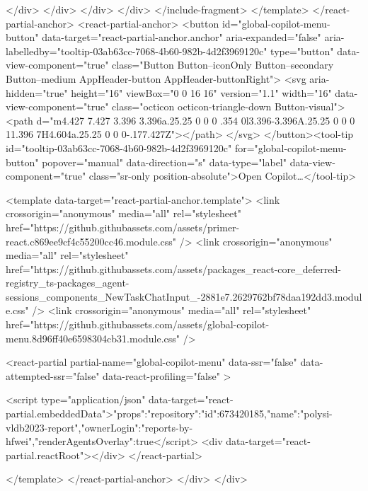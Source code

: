 </div>  </div>
</div>  </div>
</include-fragment>
      </template>
    </react-partial-anchor>
    <react-partial-anchor>
      <button id="global-copilot-menu-button" data-target="react-partial-anchor.anchor" aria-expanded="false" aria-labelledby="tooltip-03ab63cc-7068-4b60-982b-4d2f3969120c" type="button" data-view-component="true" class="Button Button--iconOnly Button--secondary Button--medium AppHeader-button AppHeader-buttonRight">  <svg aria-hidden="true" height="16" viewBox="0 0 16 16" version="1.1" width="16" data-view-component="true" class="octicon octicon-triangle-down Button-visual">
    <path d="m4.427 7.427 3.396 3.396a.25.25 0 0 0 .354 0l3.396-3.396A.25.25 0 0 0 11.396 7H4.604a.25.25 0 0 0-.177.427Z"></path>
</svg>
</button><tool-tip id="tooltip-03ab63cc-7068-4b60-982b-4d2f3969120c" for="global-copilot-menu-button" popover="manual" data-direction="s" data-type="label" data-view-component="true" class="sr-only position-absolute">Open Copilot…</tool-tip>

      <template data-target="react-partial-anchor.template">
        <link crossorigin="anonymous" media="all" rel="stylesheet" href="https://github.githubassets.com/assets/primer-react.c869ee9cf4c55200cc46.module.css" />
<link crossorigin="anonymous" media="all" rel="stylesheet" href="https://github.githubassets.com/assets/packages_react-core_deferred-registry_ts-packages_agent-sessions_components_NewTaskChatInput_-2881e7.2629762bf78daa192dd3.module.css" />
<link crossorigin="anonymous" media="all" rel="stylesheet" href="https://github.githubassets.com/assets/global-copilot-menu.8d96ff40e6598304cb31.module.css" />

<react-partial
  partial-name="global-copilot-menu"
  data-ssr="false"
  data-attempted-ssr="false"
  data-react-profiling="false"
>
  
  <script type="application/json" data-target="react-partial.embeddedData">{"props":{"repository":{"id":673420185,"name":"polysi-vldb2023-report","ownerLogin":"reports-by-hfwei"},"renderAgentsOverlay":true}}</script>
  <div data-target="react-partial.reactRoot"></div>
</react-partial>


      </template>
    </react-partial-anchor>
  </div>
</div>


